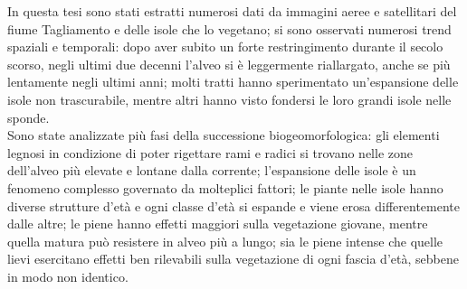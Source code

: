 In questa tesi sono stati estratti numerosi dati da immagini aeree e satellitari del fiume Tagliamento e delle isole che lo vegetano; si sono osservati numerosi trend spaziali e temporali: dopo aver subito un forte restringimento durante il secolo scorso, negli ultimi due decenni l'alveo si è leggermente riallargato, anche se più lentamente negli ultimi anni; molti tratti hanno sperimentato un'espansione delle isole non trascurabile, mentre altri hanno visto fondersi le loro grandi isole nelle sponde.
\\
Sono state analizzate più fasi della successione biogeomorfologica:
gli elementi legnosi in condizione di poter rigettare rami e radici si trovano nelle zone dell'alveo più elevate e lontane dalla corrente;
l'espansione delle isole è un fenomeno complesso governato da molteplici fattori;
le piante nelle isole hanno diverse strutture d'età e ogni classe d'età si espande e viene erosa differentemente dalle altre;
le piene hanno effetti maggiori sulla vegetazione giovane, mentre quella matura può resistere in alveo più a lungo; sia le piene intense che quelle lievi esercitano effetti ben rilevabili sulla vegetazione di ogni fascia d'età, sebbene in modo non identico.

